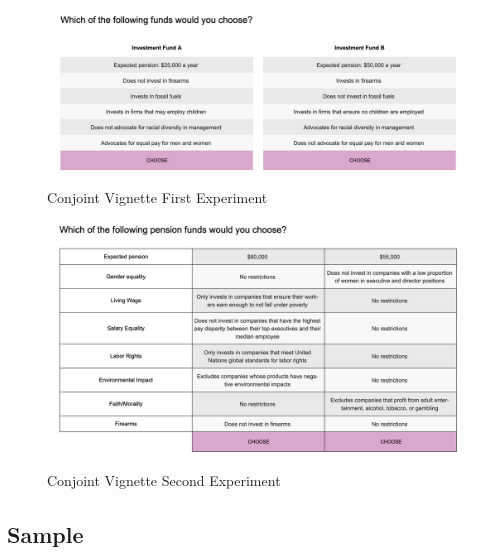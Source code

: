 \documentclass[
  12pt,
]{article}
\begin{document}
\begin{figure}

{\centering \includegraphics{cj1} 

}

\caption{Conjoint Vignette First Experiment}\label{fig:cj1}
\end{figure}

\begin{figure}

{\centering \includegraphics{cj2} 

}

\caption{Conjoint Vignette Second Experiment}\label{fig:cj2}
\end{figure}

\hypertarget{sample}{%
\subsection{Sample}\label{sample}}
\end{document}
